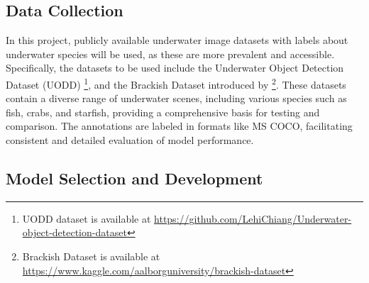\subsection{Data Collection}

In this project, publicly available underwater image datasets with labels about
underwater species will be used, as these are more prevalent and accessible.
Specifically, the datasets to be used include the Underwater Object Detection Dataset (UODD)
\parencite{jiangUnderwaterSpeciesDetection2021}\footnote{UODD dataset is available at \url{https://github.com/LehiChiang/Underwater-object-detection-dataset}},
and the Brackish Dataset introduced by \Textcite{pedersenDetectionMarineAnimals2019}
\footnote{Brackish Dataset is available at \url{https://www.kaggle.com/aalborguniversity/brackish-dataset}}.
These datasets contain a diverse range of underwater scenes,
including various species such as fish, crabs, and starfish,
providing a comprehensive basis for testing and comparison. The annotations are labeled
in formats like MS COCO, facilitating consistent and detailed evaluation of model performance.


\subsection{Model Selection and Development}

